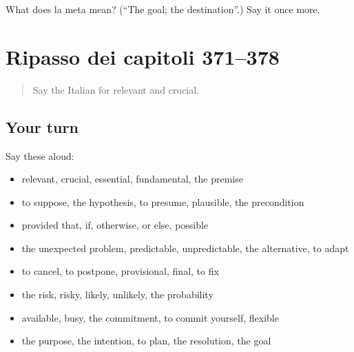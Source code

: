 \begin{tcolorbox}[breakable,colback=teal!4,colframe=teal!35!black,title={Before you move on}]
What does la meta mean? (\textquotedblleft{}The goal; the destination\textquotedblright{}.) Say it once more.
\end{tcolorbox}
\section[(dialogue)]{Ripasso dei capitoli 371–378}

\label{lesson:IT-R378-ripasso-371-378}



\begin{quote}
Say the Italian for relevant and crucial.
\end{quote}

\subsection*{Your turn}
Say these aloud:

\begin{itemize}
\raggedright
  \item relevant, crucial, essential, fundamental, the premise
  \item to suppose, the hypothesis, to presume, plausible, the precondition
  \item provided that, if, otherwise, or else, possible
  \item the unexpected problem, predictable, unpredictable, the alternative, to adapt
  \item to cancel, to postpone, provisional, final, to fix
  \item the risk, risky, likely, unlikely, the probability
  \item available, busy, the commitment, to commit yourself, flexible
  \item the purpose, the intention, to plan, the resolution, the goal
\end{itemize}


